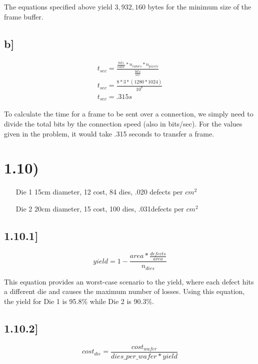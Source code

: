 \documentclass[a4paper,11pt]{article}
\begin{document}
The equations specified above yield $3,932,160$ bytes for the minimum size of the frame buffer.

\subsection*{b] }

\begin{eqnarray}
   t_{sec} = \frac{\frac{bits}{color} * n_{colors} *  n_{pixels}}{ \frac{bits}{sec}} \\
   t_{sec} = \frac{8 * 3 * (1280 * 1024)}{10^{8}} \\
   t_{sec} = .315 s  
\end{eqnarray}

To calculate the time for a frame to be sent over a connection, we simply need to divide the total bits by the connection speed (also in bits/sec).  For the values given in the problem, it would take .315 seconds to transfer a frame.  


\section*{1.10)}
\begin{enumerate}
  \item [Die 1] 15cm diameter, 12 cost, 84 dies, .020 defects per $cm^2$
  \item [Die 2] 20cm diameter, 15 cost, 100 dies, .031defects per $cm^2$
\end{enumerate}

\subsection*{1.10.1]}

\begin{equation}
yield = 1- \frac{area * \frac{defects}{area}}{n_{dies}}
\end{equation}

This equation provides an worst-case scenario to the yield, where each defect hits a different die and causes the maximum number of losses.  Using this equation, the yield for Die 1 is 95.8\% while Die 2 is 90.3\%.

\subsection*{1.10.2]}

\begin{equation}
cost_{die} = \frac{cost_{wafer}}{dies\_per\_wafer * yield}
\end{equation}
\end{document}
